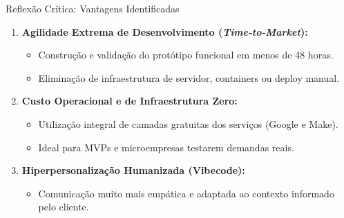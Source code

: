 \documentclass[aspectratio=169, 10pt]{beamer}
\begin{document}
\begin{frame}{Reflexão Crítica: Vantagens Identificadas}
    \begin{enumerate}
        \item \textbf{Agilidade Extrema de Desenvolvimento (\textit{Time-to-Market}):}
        \begin{itemize}
            \item Construção e validação do protótipo funcional em menos de 48 horas.
            \item Eliminação de infraestrutura de servidor, containers ou deploy manual.
        \end{itemize}
        \vspace{0.2cm}
        \item \textbf{Custo Operacional e de Infraestrutura Zero:}
        \begin{itemize}
            \item Utilização integral de camadas gratuitas dos serviços (Google e Make).
            \item Ideal para MVPs e microempresas testarem demandas reais.
        \end{itemize}
        \vspace{0.2cm}
        \item \textbf{Hiperpersonalização Humanizada (Vibecode):}
        \begin{itemize}
            \item Comunicação muito mais empática e adaptada ao contexto informado pelo cliente.
        \end{itemize}
    \end{enumerate}
\end{frame}
\end{document}
